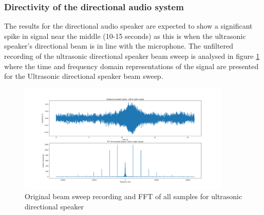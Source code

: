 \newpage

\subsubsection{Directivity of the directional audio system}
The results for the directional audio speaker are expected to show a significant spike in signal near the middle (10-15 seconds) as this is when the ultrasonic speaker's directional beam is in line with the microphone.
The unfiltered recording of the ultrasonic directional speaker beam sweep is analysed in figure \ref{fig:unfiltered_usonic_beamsweep} where the time and frequency domain representations of the signal are presented for the Ultrasonic directional speaker beam sweep.
\begin{figure}[ht!]
    \centering
    \includegraphics[width=0.9\textwidth]{Figures/Testing/BeamSweep/Ultrasonic_sqr_am/original_sig_fft_amp.png}
    \caption{Original beam sweep recording and FFT of all samples for ultrasonic directional speaker}
    \label{fig:unfiltered_usonic_beamsweep}
\end{figure}

